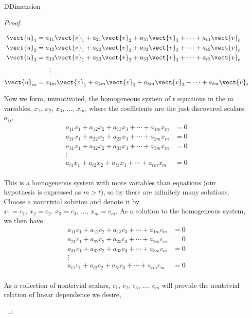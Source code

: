 \begin{subsect}{D}{Dimension}
\begin{proof}
\begin{para}
%
\begin{align*}
\vect{u}_1&=a_{11}\vect{v}_1+a_{21}\vect{v}_2+a_{31}\vect{v}_3+\cdots+a_{t1}\vect{v}_t\\
\vect{u}_2&=a_{12}\vect{v}_1+a_{22}\vect{v}_2+a_{32}\vect{v}_3+\cdots+a_{t2}\vect{v}_t\\
\vect{u}_3&=a_{13}\vect{v}_1+a_{23}\vect{v}_2+a_{33}\vect{v}_3+\cdots+a_{t3}\vect{v}_t\\
&\quad\quad\vdots\\
\vect{u}_m&=a_{1m}\vect{v}_1+a_{2m}\vect{v}_2+a_{3m}\vect{v}_3+\cdots+a_{tm}\vect{v}_t
\end{align*}
\end{para}
%
\begin{para}Now we form, unmotivated, the homogeneous system of $t$ equations in the $m$ variables, $x_1,\,x_2,\,x_3,\,\ldots,\,x_m$, where the coefficients are the just-discovered scalars $a_{ij}$,
%
\begin{align*}
a_{11}x_1+a_{12}x_2+a_{13}x_3+\cdots+a_{1m}x_m&=0\\
a_{21}x_1+a_{22}x_2+a_{23}x_3+\cdots+a_{2m}x_m&=0\\
a_{31}x_1+a_{32}x_2+a_{33}x_3+\cdots+a_{3m}x_m&=0\\
\vdots\quad\quad&\\
a_{t1}x_1+a_{t2}x_2+a_{t3}x_3+\cdots+a_{tm}x_m&=0\\
\end{align*}
\end{para}
%
\begin{para}This is a homogeneous system with more variables than equations (our hypothesis is expressed as $m>t$), so by  there are infinitely many solutions.  Choose a nontrivial solution and denote it by $x_1=c_1,\,x_2=c_2,\,x_3=c_3,\,\ldots,\,x_m=c_m$.  As a solution to the homogeneous system, we then have
%
\begin{align*}
a_{11}c_1+a_{12}c_2+a_{13}c_3+\cdots+a_{1m}c_m&=0\\
a_{21}c_1+a_{22}c_2+a_{23}c_3+\cdots+a_{2m}c_m&=0\\
a_{31}c_1+a_{32}c_2+a_{33}c_3+\cdots+a_{3m}c_m&=0\\
\vdots\quad\quad&\\
a_{t1}c_1+a_{t2}c_2+a_{t3}c_3+\cdots+a_{tm}c_m&=0\\
\end{align*}
\end{para}
%
\begin{para}As a collection of nontrivial scalars, $c_1,\,c_2,\,c_3,\,\dots,\,c_m$ will provide the nontrivial relation of linear dependence we desire,

\end{para}
\end{proof}
\end{subsect}
